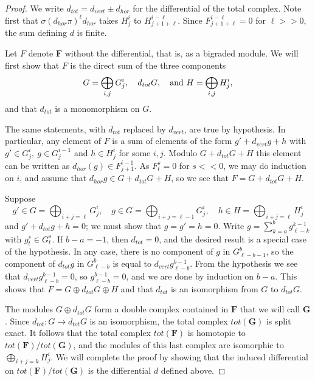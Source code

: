 \documentclass{tran-l}
\newcommand{\FF}{\mathbf{F}}
\newcommand{\GG}{\mathbf{G}}
\theoremstyle{plain}
\theoremstyle{remark}
\theoremstyle{definition}
\begin{document}
\begin{proof}  We write $d_{tot}=d_{vert}\pm d_{hor}$ for the differential
of the total complex. Note first that $\sigma (d_{hor} \pi )^{\ell }d_{hor}$ takes
$H^{i}_{j}$ to $H^{i-\ell }_{j+1+\ell }$. Since $F^{i-\ell }_{j+1+\ell }=0$
for $\ell >>0$,
the sum defining $d$ is finite.

Let $F$ denote $\FF $ without the differential, that is, as a bigraded module.
We will first show that
$F$ is the direct sum of the three components
\begin{equation*}G=\bigoplus _{i,j} G^{i}_{j},
\quad d_{tot}G,
\quad \hbox {and   }
H=\bigoplus _{i,j} H^{i}_{j},
\end{equation*}
and that $d_{tot}$ is a monomorphism on $G$.

The same statements, with $d_{tot}$ replaced by
$d_{vert}$, are true by hypothesis.
In particular, any element of $F$ is a sum of elements of the form
$g'+d_{vert}g+h$ with $g'\in G^{i}_{j},\ g\in G^{i-1}_{j}$ and $h\in H^{i}_{j}$
for some $i,j$. Modulo $G+d_{tot}G+H$ this element can be written as
$d_{hor}(g)\in F^{i-1}_{j+1}$. As $F^{s}_{t}=0$ for $s<<0$, we may
do induction on $i$, and
assume that $d_{hor}g \in G+d_{tot}G+H$, so we see
that $F=G+d_{tot}G+H$.

Suppose
\begin{equation*}g'\in G=\bigoplus _{i+j=\ell } G^{i}_{j},
\quad g\in G=\bigoplus _{i+j=\ell -1} G^{i}_{j},
\quad 
h\in H=\bigoplus _{i+j=\ell } H^{i}_{j}
\end{equation*}
and $g'+d_{tot}g+h=0$; we must show that $g=g'=h=0$.
Write $g=\sum _{k=a}^{b}  g^{k-1}_{\ell -k}$ with
$g^{s}_{t}\in G^{s}_{t}$.
If $b-a=-1$, then
$d_{tot}=0$, and the desired result is
a special case of the hypothesis. In any case, there is no
component of $g$ in $G^{b}_{\ell -b-1}$, so
the
component of $d_{tot}g$ in
$G^{b}_{\ell -b}$ is equal to $d_{vert}g^{b-1}_{\ell -b}$. From the
hypothesis we see that $d_{vert}g^{b-1}_{\ell -b}=0$,
so $g^{b-1}_{\ell -b}=0$, and we are done by induction
on $b-a$. This shows that $F=G\oplus d_{tot}G\oplus H$ and that
$d_{tot}$ is an isomorphism from $G$ to $d_{tot}G$.

The modules $G\oplus d_{tot}G$ form a
double complex contained in $\FF $ that we will call $\GG $.
Since $d_{tot}:G\to d_{tot}G$ is
an isomorphism, the total complex $tot(\GG )$ is split exact.
It follows that the total complex $tot(\FF )$ is
homotopic to $tot(\FF )/tot(\GG )$, and the modules of
this last complex are isomorphic to $\bigoplus _{i+j=k}H^{i}_{j}$.
We will complete
the proof by showing that the induced differential on
$tot(\FF )/tot(\GG )$ is the differential $d$ defined above.


\end{proof}
\end{document}
